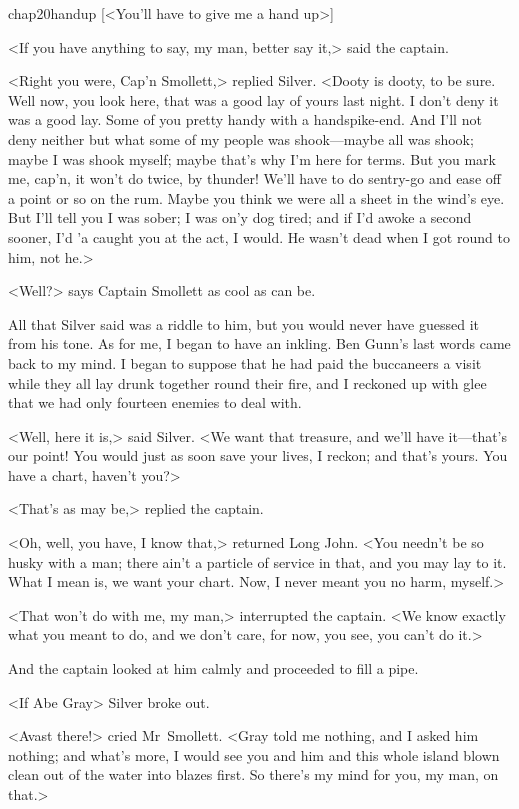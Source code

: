 \begin{bwbigpic}
	[\basicscale]
	{chap20handup}
	[<You'll have to give me a hand up>]
\end{bwbigpic}

<If you have anything to say, my man, better say it,> said the captain.

<Right you were, Cap'n Smollett,> replied Silver. <Dooty is dooty, to be sure. Well now, you look here, that was a good lay of yours last night. I don't deny it was a good lay. Some of you pretty handy with a handspike-end. And I'll not deny neither but what some of my people was shook—maybe all was shook; maybe I was shook myself; maybe that's why I'm here for terms. But you mark me, cap'n, it won't do twice, by thunder! We'll have to do sentry-go and ease off a point or so on the rum. Maybe you think we were all a sheet in the wind's eye. But I'll tell you I was sober; I was on'y dog tired; and if I'd awoke a second sooner, I'd 'a caught you at the act, I would. He wasn't dead when I got round to him, not he.>

<Well?> says Captain Smollett as cool as can be.

All that Silver said was a riddle to him, but you would never have guessed it from his tone. As for me, I began to have an inkling. Ben Gunn's last words came back to my mind. I began to suppose that he had paid the buccaneers a visit while they all lay drunk together round their fire, and I reckoned up with glee that we had only fourteen enemies to deal with.

<Well, here it is,> said Silver. <We want that treasure, and we'll have it—that's our point! You would just as soon save your lives, I reckon; and that's yours. You have a chart, haven't you?>

<That's as may be,> replied the captain.

<Oh, well, you have, I know that,> returned Long John. <You needn't be so husky with a man; there ain't a particle of service in that, and you may lay to it. What I mean is, we want your chart. Now, I never meant you no harm, myself.>

<That won't do with me, my man,> interrupted the captain. <We know exactly what you meant to do, and we don't care, for now, you see, you can't do it.>

And the captain looked at him calmly and proceeded to fill a pipe.

<If Abe Gray\longdash> Silver broke out.

<Avast there!> cried Mr~Smollett. <Gray told me nothing, and I asked him nothing; and what's more, I would see you and him and this whole island blown clean out of the water into blazes first. So there's my mind for you, my man, on that.>

